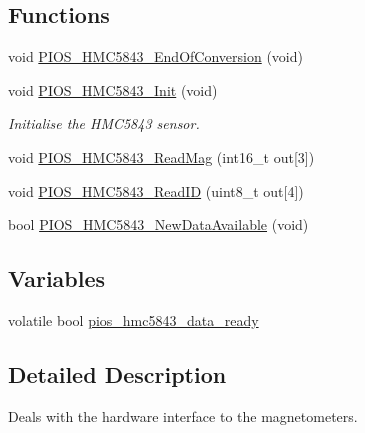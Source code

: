 \subsection*{\-Functions}
\begin{DoxyCompactItemize}
\item 
void \hyperlink{group___p_i_o_s___h_m_c5843_gac016f8f6dfcacc6663a7802760513dfe}{\-P\-I\-O\-S\-\_\-\-H\-M\-C5843\-\_\-\-End\-Of\-Conversion} (void)
\item 
void \hyperlink{group___p_i_o_s___h_m_c5843_gafd99d34d6d59ae4b38f66bfa43321c91}{\-P\-I\-O\-S\-\_\-\-H\-M\-C5843\-\_\-\-Init} (void)
\begin{DoxyCompactList}\small\item\em \-Initialise the \-H\-M\-C5843 sensor. \end{DoxyCompactList}\item 
void \hyperlink{group___p_i_o_s___h_m_c5843_gae47b960756eb5e51acb4f30c4a0158e4}{\-P\-I\-O\-S\-\_\-\-H\-M\-C5843\-\_\-\-Read\-Mag} (int16\-\_\-t out\mbox{[}3\mbox{]})
\item 
void \hyperlink{group___p_i_o_s___h_m_c5843_ga957c354cdb5c4fa92ea39d26536813cb}{\-P\-I\-O\-S\-\_\-\-H\-M\-C5843\-\_\-\-Read\-I\-D} (uint8\-\_\-t out\mbox{[}4\mbox{]})
\item 
bool \hyperlink{group___p_i_o_s___h_m_c5843_ga24a7367bbf88f9e9d7508ee3248cdfeb}{\-P\-I\-O\-S\-\_\-\-H\-M\-C5843\-\_\-\-New\-Data\-Available} (void)
\end{DoxyCompactItemize}
\subsection*{\-Variables}
\begin{DoxyCompactItemize}
\item 
volatile bool \hyperlink{group___p_i_o_s___h_m_c5843_ga1291044661f010eff5b969133a2e905b}{pios\-\_\-hmc5843\-\_\-data\-\_\-ready}
\end{DoxyCompactItemize}


\subsection{\-Detailed \-Description}
\-Deals with the hardware interface to the magnetometers. 

